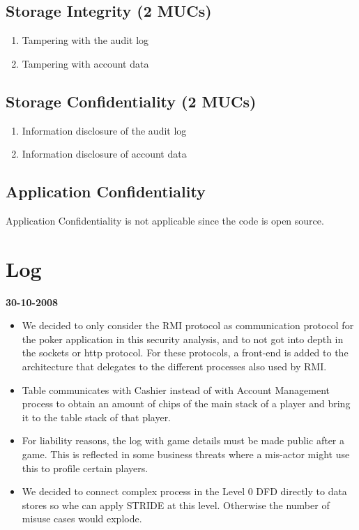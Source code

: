 \documentclass[a4paper,11pt]{report}
\begin{document}
\subsection{Storage Integrity (2 MUCs)}
\begin{enumerate}
\item Tampering with the audit log
\item Tampering with account data
\end{enumerate}

\subsection{Storage Confidentiality (2 MUCs)}
\begin{enumerate}
\item Information disclosure of the audit log
\item Information disclosure of account data
\end{enumerate}

\subsection{Application Confidentiality}
Application Confidentiality is not applicable since the code is open source.

\section{Log}
\textbf{30-10-2008}
\begin{itemize}
\item We decided to only consider the RMI protocol as communication protocol for the poker application in this
security analysis, and to not got into depth in the sockets or http protocol. For these protocols, a front-end is added to the architecture that delegates to the different processes also used by RMI.
\item Table communicates with Cashier instead of with Account Management process to obtain an amount of chips
of the main stack of a player and bring it to the table stack of that player.
\item For liability reasons, the log with game details must be made public after a game. This is reflected in some
business threats where a mis-actor might use this to profile certain players.
\item We decided to connect complex process in the Level 0 DFD directly to data stores so whe can apply STRIDE
at this level. Otherwise the number of misuse cases would explode.
\end{itemize}
\end{document}
